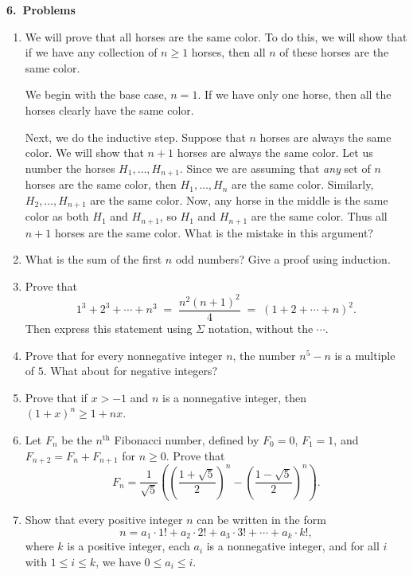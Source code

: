 \documentclass[11pt]{article}
\begin{document}
\begin{center}
{\Large \textbf{6.\ Problems}}
\end{center}

\begin{enumerate}

\item We will prove that all horses are the same color. To do this,
we will show that if we have any collection of $n \ge 1$ horses,
then all $n$ of these horses are the same color.

We begin with the base case, $n=1$. If we have only one
horse, then all the horses clearly have the same color.

Next, we do the inductive step. Suppose that $n$ horses are
always the same color. We will show that $n+1$ horses are always
the same color. Let us number the horses $H_1,\ldots,H_{n+1}$.
Since we are assuming that \emph{any} set of $n$ horses are the
same color, then $H_1,\ldots,H_n$ are the same color. Similarly,
$H_2,\ldots,H_{n+1}$ are the same color. Now, any horse in the middle
is the same color as both $H_1$ and $H_{n+1}$, so $H_1$ and $H_{n+1}$
are the same color. Thus all $n+1$ horses are the same color.\newline
What is the mistake in this argument?

\item What is the sum of the first $n$ odd numbers? Give a proof using induction.

\item Prove that
\[
1^3 + 2^3 + \cdots + n^3 \;=\; \frac{n^2(n+1)^2}{4} \;=\; (1+2+\cdots+n)^2.
\]
Then express this statement using $\Sigma$ notation, without the $\cdots$.

\item Prove that for every nonnegative integer $n$, the number $n^5-n$
is a multiple of $5$. What about for negative integers?

\item Prove that if $x>-1$ and $n$ is a nonnegative integer, then
$(1+x)^n \ge 1+nx$.

\item Let $F_n$ be the $n^{\text{th}}$ Fibonacci number, defined by $F_0=0$,
$F_1=1$, and $F_{n+2}=F_n+F_{n+1}$ for $n\ge 0$. Prove that
\[
F_n=\frac{1}{\sqrt{5}}\left(\left(\frac{1+\sqrt{5}}{2}\right)^{\!n}
-\left(\frac{1-\sqrt{5}}{2}\right)^{\!n}\right).
\]

\item Show that every positive integer $n$ can be written in the form
\[
n=a_1\cdot 1! + a_2\cdot 2! + a_3\cdot 3! + \cdots + a_k\cdot k!,
\]
where $k$ is a positive integer, each $a_i$ is a nonnegative integer,
and for all $i$ with $1\le i\le k$, we have $0\le a_i\le i$.


\end{enumerate}
\end{document}

